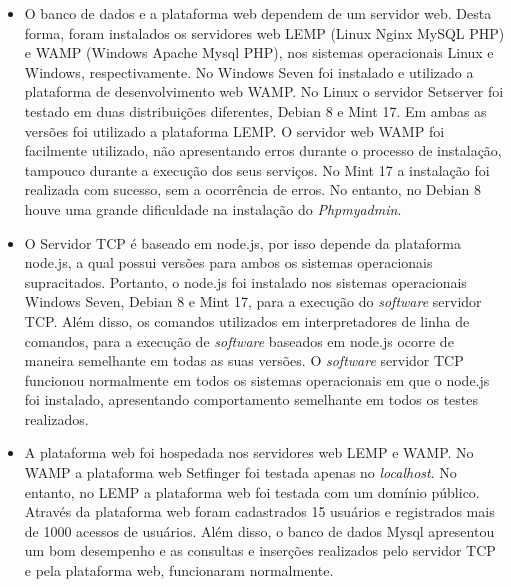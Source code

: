 \begin{itemize}
    
  \item O banco de dados e a plataforma web dependem de um servidor web. Desta forma, foram instalados os servidores web LEMP (Linux Nginx MySQL PHP) e WAMP (Windows Apache Mysql PHP), nos sistemas operacionais Linux e Windows, respectivamente. No Windows Seven foi instalado e utilizado a plataforma de desenvolvimento web WAMP. No Linux o servidor Setserver foi testado em duas distribuições diferentes, Debian 8 e Mint 17. Em ambas as versões foi utilizado a plataforma LEMP. O servidor web WAMP foi facilmente utilizado, não apresentando erros durante o processo de instalação, tampouco durante a execução dos seus serviços. No Mint 17 a instalação foi realizada com sucesso, sem a ocorrência de erros. No entanto, no Debian 8 houve uma grande dificuldade na instalação do \textit{Phpmyadmin}. 
  
  \item O Servidor TCP é baseado em node.js, por isso depende da plataforma node.js, a qual possui versões para ambos os sistemas operacionais supracitados. Portanto, o node.js foi instalado nos sistemas operacionais Windows Seven, Debian 8 e Mint 17, para a execução do \textit{software} servidor TCP. Além disso, os comandos utilizados em interpretadores de linha de comandos, para a execução de \textit{software} baseados em node.js ocorre de maneira semelhante em todas as suas versões. O \textit{software} servidor TCP funcionou normalmente em todos os sistemas operacionais em que o node.js foi instalado, apresentando comportamento semelhante em todos os testes realizados.  
  
  \item A plataforma web foi hospedada nos servidores web LEMP e WAMP. No WAMP a plataforma web Setfinger foi testada apenas no \textit{localhost}. No entanto, no LEMP a plataforma web foi testada com um domínio público. Através da plataforma web foram cadastrados 15 usuários e registrados mais de 1000 acessos de usuários. Além disso, o banco de dados Mysql apresentou um bom desempenho e as consultas e inserções realizados pelo servidor TCP e pela plataforma web, funcionaram normalmente.   
  
  


\end{itemize}


